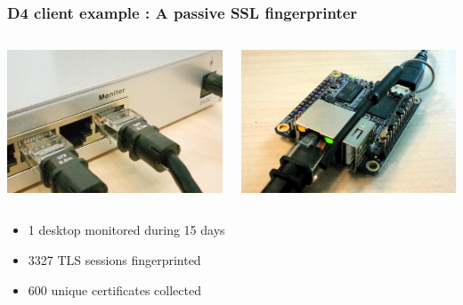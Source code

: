 \documentclass{beamer}
\begin{document}
\begin{frame}
        \frametitle{D4 client example : A passive SSL fingerprinter}
        \begin{columns}
            \begin{column}{0.5\textwidth}
              \begin{center}
                \includegraphics[scale=0.2]{monitor.png}
              \end{center}
            \end{column}
            \begin{column}{0.5\textwidth} 
              \begin{center}
                \includegraphics[scale=0.2]{orangepi.png}
              \end{center}
            \end{column}
          \end{columns}
          \hspace{20pt}
          \begin{itemize}
            \item 1 desktop monitored during 15 days
            \item 3327 TLS sessions fingerprinted
            \item 600 unique certificates collected
          \end{itemize}
\end{frame}
\end{document}
